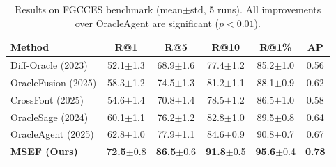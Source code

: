 \documentclass{article}
\begin{document}
\begin{table}[t]
\centering
\small
\caption{Results on FGCCES benchmark (mean$\pm$std, 5 runs). All improvements over OracleAgent are significant ($p < 0.01$).}
\label{tab:fgcces_results}
\setlength{\tabcolsep}{2.5pt}
\begin{tabular}{lccccc}
\toprule
\textbf{Method} & \textbf{R@1} & \textbf{R@5} & \textbf{R@10} & \textbf{R@1\%} & \textbf{AP} \\
\midrule
Diff-Oracle (2023) & 52.1{\scriptsize$\pm$1.3} & 68.9{\scriptsize$\pm$1.6} & 77.4{\scriptsize$\pm$1.2} & 85.2{\scriptsize$\pm$1.0} & 0.56 \\
OracleFusion (2025) & 58.3{\scriptsize$\pm$1.2} & 74.5{\scriptsize$\pm$1.3} & 81.2{\scriptsize$\pm$1.1} & 88.1{\scriptsize$\pm$0.9} & 0.62 \\
CrossFont (2025) & 54.6{\scriptsize$\pm$1.4} & 70.8{\scriptsize$\pm$1.4} & 78.5{\scriptsize$\pm$1.2} & 86.5{\scriptsize$\pm$1.0} & 0.58 \\
OracleSage (2024) & 60.1{\scriptsize$\pm$1.1} & 76.2{\scriptsize$\pm$1.2} & 82.8{\scriptsize$\pm$1.0} & 89.5{\scriptsize$\pm$0.8} & 0.64 \\
OracleAgent (2025) & 62.8{\scriptsize$\pm$1.0} & 77.9{\scriptsize$\pm$1.1} & 84.6{\scriptsize$\pm$0.9} & 90.8{\scriptsize$\pm$0.7} & 0.67 \\
\midrule
\rowcolor{gray!10}
\textbf{MSEF (Ours)} & \textbf{72.5}{\scriptsize$\pm$0.8} & \textbf{86.5}{\scriptsize$\pm$0.6} & \textbf{91.8}{\scriptsize$\pm$0.5} & \textbf{95.6}{\scriptsize$\pm$0.4} & \textbf{0.78} \\
\bottomrule
\end{tabular}
\end{table}


\end{document}
